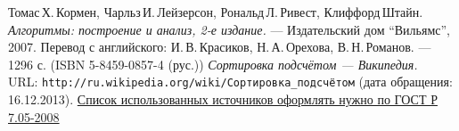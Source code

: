 \begin{thebibliography}{99}
    Томас\,Х.\,Кормен, Чарльз\,И.\,Лейзерсон, Рональд\,Л.\,Ривест, Клиффорд\,Штайн.
    {\itshape Алгоритмы: построение и анализ, 2-е издание.} --- Издательский дом \enquote{Вильямс}, 2007. Перевод с английского: И.\,В.\,Красиков, Н.\,А.\,Орехова, В.\,Н.\,Романов. --- 1296 с. (ISBN 5-8459-0857-4 (рус.))
    {\itshape Сортировка подсчётом — Википедия.} \\URL: \texttt{http://ru.wikipedia.org/wiki/Сортировка\_подсчётом} (дата обращения: 16.12.2013).
    \href{http://www.ifap.ru/library/gost/7052008.pdf}{Список использованных источников оформлять нужно по  ГОСТ Р 7.05-2008}
    \end{thebibliography}
    \pagebreak